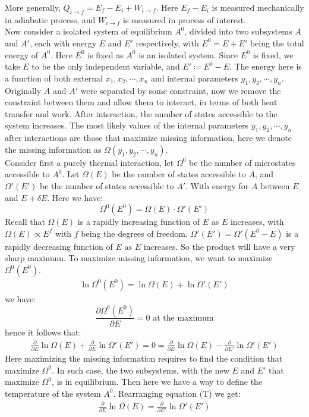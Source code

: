 \documentclass[11pt,oneside]{book}
\theoremstyle{break}
\theoremstyle{break}
\begin{document}
\hfill\break
More generally, $Q_{i\to f} = E_f - E_i + W_{i \to f}$. Here $E_f - E_i$ is measured mechanically in adiabatic process, and $W_{i \to f}$ is measured in process of interest.\\


Now consider a isolated system of equilibrium $A^0$, divided into two subsystems $A$ and $A'$, each with energy $E$ and $E'$ respectively, with $E^0 = E+E'$ being the total energy of $A^0$. Here $E^0$ is fixed as $A^0$ is an isolated system. Since $E^0$ is fixed, we take $E$ to be the only independent variable, and $E' \coloneqq E^0 - E$. The energy here is a function of both external $x_1,x_2,\cdots, x_n$ and internal parameters $y_1,y_2,\cdots, y_n$. Originally $A$ and $A'$ were separated by some constraint, now we remove the constraint between them and allow them to interact, in terms of both heat transfer and work. After interaction, the number of states accessible to the system increases. The most likely values of the internal parameters $y_1,y_2,\cdots,y_n$ after interactions are those that maximize missing information, here we denote the missing information as $\Omega(y_1,y_2,\cdots, y_n)$.\\

Consider first a purely thermal interaction, let $\Omega^0$ be the number of microstates accessible to $A^0$. Let $\Omega(E)$ be the number of states accessible to $A$, and $\Omega'(E')$ be the number of states accessible to $A'$. With energy for $A$ between $E$ and $E+\delta E$.
Here we have:
$$\Omega^0(E^0) = \Omega(E) \cdot \Omega' (E')$$
Recall that $\Omega(E)$ is a rapidly increasing function of $E$ as $E$ increases, with $\Omega(E) \propto E^f$ with $f$ being the degrees of freedom. $\Omega'(E') = \Omega'(E^0-E)$ is a rapidly  decreasing function of $E$ as $E $ increases. So the product will have a very sharp maximum. To maximize missing information, we want to maximize $\Omega^0(E^0)$. 
\begin{align*}
 \ln \Omega^0(E^0) = \ln \Omega(E) + \ln \Omega' (E')
\end{align*}
we have:
$$\frac{\partial \Omega^0(E^0)}{\partial E} = 0 \text{ at the maximum}$$
hence it follows that:
\begin{align*}
\frac{\partial }{\partial E}\ln \Omega(E) + \frac{\partial }{\partial E}\ln \Omega'(E') = 0 = \frac{\partial}{\partial E} \ln \Omega(E) - \frac{\partial }{\partial E'}\ln \Omega'(E') \tag{T}
\end{align*}
Here maximizing the missing information requires to find the condition that maximize $\Omega^0$. In such case, the two subsystems, with the new $E$ and $E'$ that maximize $\Omega^0$, is in equilibrium. Then here we have a way to define the temperature of the system $A^0$.
Rearranging equation (T) we get:
\begin{align*}
\frac{\partial }{\partial E}\ln \Omega(E) = \frac{\partial }{\partial E'}\ln \Omega'(E')
\end{align*}
\end{document}
